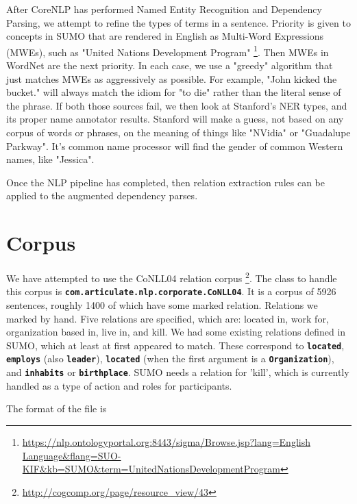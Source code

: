 \documentclass{book}
\newcommand{\tsumo}[1]{{\small \textbf{\texttt{#1}}}}
\begin{document}
After CoreNLP has performed Named Entity Recognition and Dependency Parsing, we
attempt to refine the types of terms in a sentence.  Priority is given to
concepts in SUMO that are rendered in English as Multi-Word Expressions (MWEs),
such as "United Nations Development Program"
\footnote{\url{https://nlp.ontologyportal.org:8443/sigma/Browse.jsp?lang=English
Language&flang=SUO-KIF&kb=SUMO&term=UnitedNationsDevelopmentProgram}}. Then MWEs
in WordNet are the next priority.  In each case, we use a "greedy" algorithm
that just matches MWEs as aggressively as possible. For example, "John kicked the
bucket." will always match the idiom for "to die" rather than the literal sense
of the phrase.  If both those sources fail, we then look at Stanford's NER
types, and its proper name annotator results.  Stanford will make a guess, not
based on any corpus of words or phrases, on the meaning of things like "NVidia"
or "Guadalupe Parkway".  It's common name processor will find the gender of
common Western names, like "Jessica".

Once the NLP pipeline has completed, then relation extraction rules can be
applied to the augmented dependency parses.

\section{Corpus}

We have attempted to use the CoNLL04 relation corpus
\footnote{\url{http://cogcomp.org/page/resource_view/43}}. The class to handle this corpus
is \tsumo{com.articulate.nlp.corporate.CoNLL04}. It is a corpus of
5926 sentences, roughly 1400 of which have some marked relation. Relations we
marked by hand.  Five relations are specified, which are: located in, work for,
organization based in, live in, and kill. We had some existing relations defined
in SUMO, which at least at first appeared to match.  These correspond to
\tsumo{located}, \tsumo{employs} (also \tsumo{leader}), \tsumo{located} (when
the first argument is a \tsumo{Organization}), and \tsumo{inhabits} or
\tsumo{birthplace}. SUMO needs a relation for 'kill', which is currently handled
as a type of action and roles for participants.

The format of the file is
\end{document}
